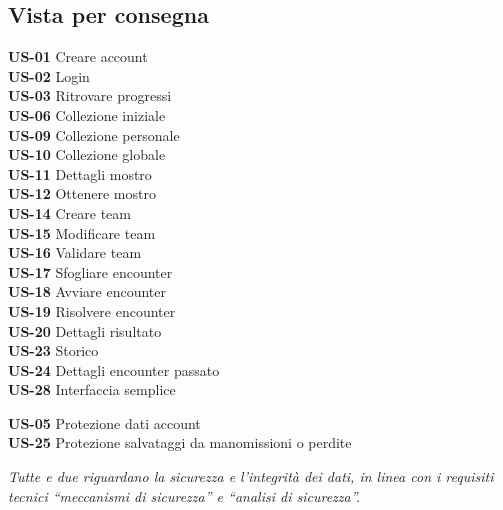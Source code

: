 \documentclass[11pt,a4paper]{article}
\newcommand{\us}[1]{\textbf{\color{accent}US-#1}}
\begin{document}
\subsection{Vista per consegna}

\begin{tcbraster}[raster columns=3,raster equal height,raster column skip=3mm]
  \begin{tcolorbox}[colback=prRed!5,colframe=prRed,title={Primo prototipo (18)},fonttitle=\bfseries\small,arc=3pt,left=5pt,right=5pt]
    \footnotesize
    \us{01} Creare account\\
    \us{02} Login\\
    \us{03} Ritrovare progressi\\
    \us{06} Collezione iniziale\\
    \us{09} Collezione personale\\
    \us{10} Collezione globale\\
    \us{11} Dettagli mostro\\
    \us{12} Ottenere mostro\\
    \us{14} Creare team\\
    \us{15} Modificare team\\
    \us{16} Validare team\\
    \us{17} Sfogliare encounter\\
    \us{18} Avviare encounter\\
    \us{19} Risolvere encounter\\
    \us{20} Dettagli risultato\\
    \us{23} Storico\\
    \us{24} Dettagli encounter passato\\
    \us{28} Interfaccia semplice
  \end{tcolorbox}
  \begin{tcolorbox}[colback=prYellow!10,colframe=prYellow!90!black,coltitle=black,title={+ Consegna finale (2)},fonttitle=\bfseries\small,arc=3pt,left=5pt,right=5pt]
    \footnotesize
    \us{05} Protezione dati account\\
    \us{25} Protezione salvataggi da manomissioni o perdite

    \medskip
    \textit{Tutte e due riguardano la sicurezza e l'integrità dei dati, in linea con i requisiti tecnici
    ``meccanismi di sicurezza'' e ``analisi di sicurezza''.}


\end{tcolorbox}
\end{tcbraster}
\end{document}
